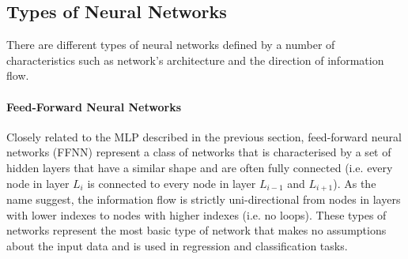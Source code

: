 \subsection{Types of Neural Networks} \label{sec:nn-types}
There are different types of neural networks defined by a number of characteristics such as network's architecture and the direction of information flow. 

\paragraph{Feed-Forward Neural Networks} Closely related to the MLP described in the previous section, feed-forward neural networks (FFNN) represent a class of networks that is characterised by a set of hidden layers that have a similar shape and are often fully connected (i.e. every node in layer $L_i$ is connected to every node in layer $L_{i-1}$ and $L_{i+1}$). As the name suggest, the information flow is strictly uni-directional from nodes in layers with lower indexes to nodes with higher indexes (i.e. no loops). These types of networks represent the most basic type of network that makes no assumptions about the input data and is used in regression and classification tasks.  

